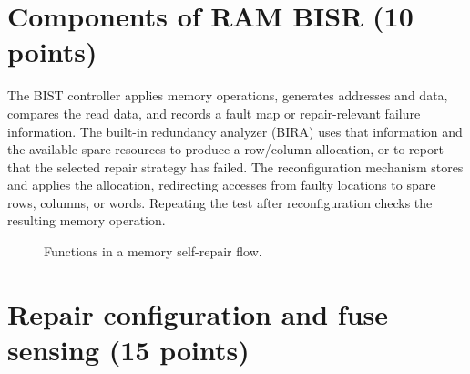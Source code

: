 \section{Components of RAM BISR (10 points)}
\answer The BIST controller applies memory operations, generates addresses and data, compares the read data, and records a fault map or repair-relevant failure information. The built-in redundancy analyzer (BIRA) uses that information and the available spare resources to produce a row/column allocation, or to report that the selected repair strategy has failed. The reconfiguration mechanism stores and applies the allocation, redirecting accesses from faulty locations to spare rows, columns, or words. Repeating the test after reconfiguration checks the resulting memory operation.
\begin{figure}[ht]\centering
{}
\caption{Functions in a memory self-repair flow.}
\end{figure}

\section{Repair configuration and fuse sensing (15 points)}
